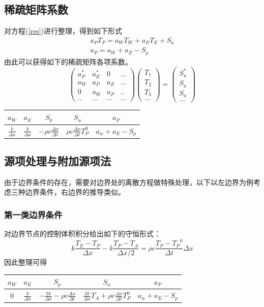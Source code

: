 \documentclass[10pt]{scrartcl}
\begin{document}
\subsection{稀疏矩阵系数}
对方程(\ref{res})进行整理，得到如下形式
\begin{align}
	a_PT_P = a_WT_W+a_ET_E+S_u\\
	a_P = a_W+a_E-S_p
\end{align}
由此可以获得如下的稀疏矩阵各项系数。
\begin{equation}
\left(
	\begin{array}{cccc}
	a_P^{*}& a_E^{*} &0&...  \\ 
	a_W&a_P &a_E& ... \\ 
	0& a_W & a_P&..\\
	..&...&...&...
	\end{array} 
\right)
\left(
	\begin{array}{c}
	T_1\\ 
	T_2\\ 
	T_3\\
	...
	\end{array}
\right)
=
\left(
	\begin{array}{c}
	S_u^{*}\\ 
	S_u\\ 
	S_u\\
	...
	\end{array}
\right)
\end{equation}
\begin{center}
	\begin{tabular}{|c|c|c|c|c|}
		\hline 
		$a_W$&  $a_E$&$S_p$& $S_u$ & $a_P$ \\ 
		\hline 
		$\frac{k}{\Delta x}$& $\frac{k}{\Delta x}$ &$-\rho c \frac{\Delta x}{\Delta t}$&$ \rho c \frac{\Delta x}{\Delta t}T_P^0$ &$a_w+a_E-S_p$  \\ 
		\hline 
	\end{tabular} 
\end{center}
\subsection{源项处理与附加源项法}
由于边界条件的存在，需要对边界处的离散方程做特殊处理，以下以左边界为例考虑三种边界条件，右边界的推导类似。
\subsubsection{第一类边界条件}
对边界节点的控制体积积分给出如下的守恒形式：
\begin{equation}
	k\frac{T_E-T_P}{\Delta x}-k\frac{T_P-T_A}{\Delta x/2}=\rho c \frac{T_P-{T_P}^0}{\Delta t}\Delta x
\end{equation}
因此整理可得
\begin{center}
\begin{tabular}{|c|c|c|c|c|}
	\hline 
	$a_W$&  $a_E$&$S_p$& $S_u$ & $a_P$ \\ 
	\hline 
	 0& $\frac{k}{\Delta x}$ &$-\frac{2k}{\Delta x}-\rho c \frac{\Delta x}{\Delta t}$&$ \frac{2k}{\Delta x}T_A+\rho c\frac{\Delta x}{\Delta t} T_P^0$ &$a_w+a_E-S_p$  \\ 
	\hline 
\end{tabular} 
\end{center}
\end{document}
